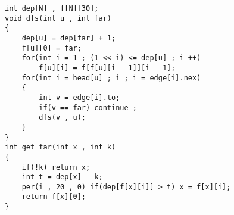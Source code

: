 \documentclass[E:/GsjzTle/main/main.tex]{subfiles}
\begin{document}
\begin{lstlisting}
int dep[N] , f[N][30];
void dfs(int u , int far)
{
	dep[u] = dep[far] + 1;
	f[u][0] = far;
	for(int i = 1 ; (1 << i) <= dep[u] ; i ++)	
		f[u][i] = f[f[u][i - 1]][i - 1];
	for(int i = head[u] ; i ; i = edge[i].nex)
	{
		int v = edge[i].to;
		if(v == far) continue ;		
		dfs(v , u);
 	}
} 
int get_far(int x , int k)
{
	if(!k) return x;
    int t = dep[x] - k;
    per(i , 20 , 0) if(dep[f[x][i]] > t) x = f[x][i];
    return f[x][0];
}
\end{lstlisting}
\end{document}
